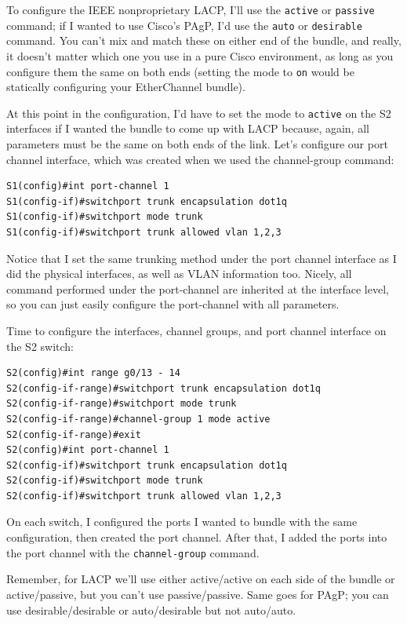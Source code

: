 \documentclass[b5paper,11pt]{memoir}
\begin{document}
To configure the IEEE nonproprietary LACP, I'll use the \texttt{active}
or \texttt{passive} command; if I wanted to use Cisco's PAgP, I'd use
the \texttt{auto} or \texttt{desirable} command. You can't mix and match
these on either end of the bundle, and really, it doesn't matter which
one you use in a pure Cisco environment, as long as you configure them
the same on both ends (setting the mode to \texttt{on} would be
statically configuring your EtherChannel bundle).

At this point in the configuration, I'd have to set the mode to
\texttt{active} on the S2 interfaces if I wanted the bundle to come up
with LACP because, again, all parameters must be the same on both ends
of the link. Let's configure our port channel interface, which was
created when we used the channel-group command:

\begin{verbatim}
S1(config)#int port-channel 1
S1(config-if)#switchport trunk encapsulation dot1q
S1(config-if)#switchport mode trunk
S1(config-if)#switchport trunk allowed vlan 1,2,3
\end{verbatim}

Notice that I set the same trunking method under the port channel
interface as I did the physical interfaces, as well as VLAN information
too. Nicely, all command performed under the port-channel are inherited
at the interface level, so you can just easily configure the
port-channel with all parameters.

Time to configure the interfaces, channel groups, and port channel interface on the S2 switch:

\begin{verbatim}
S2(config)#int range g0/13 - 14
S2(config-if-range)#switchport trunk encapsulation dot1q
S2(config-if-range)#switchport mode trunk
S2(config-if-range)#channel-group 1 mode active
S2(config-if-range)#exit
S2(config)#int port-channel 1
S2(config-if)#switchport trunk encapsulation dot1q
S2(config-if)#switchport mode trunk
S2(config-if)#switchport trunk allowed vlan 1,2,3
\end{verbatim}

On each switch, I configured the ports I wanted to bundle with the same
configuration, then created the port channel. After that, I added the
ports into the port channel with the \texttt{channel-group} command.

Remember, for LACP we'll use either active/active on each side of the
bundle or active/passive, but you can't use passive/passive. Same goes
for PAgP; you can use desirable/desirable or auto/desirable but not
auto/auto.
\end{document}
